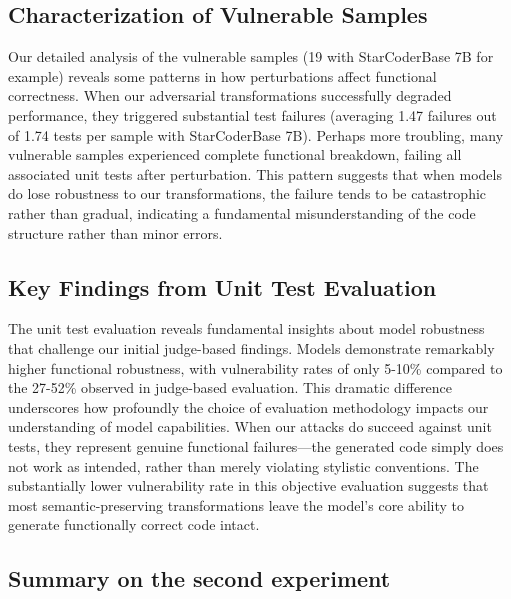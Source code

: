 \documentclass[%
thesis=student,%
coverpage=false,%
titlepage=false,%
headmarks=true, %
english,%
font=libertine, %
math=newpxtx, %
BCOR=5mm,%
coverBCOR=11mm%
]{tum-templates/book/tumbook}
\begin{document}
\subsection{Characterization of Vulnerable Samples}

Our detailed analysis of the vulnerable samples (19 with StarCoderBase 7B for example) reveals some patterns in how perturbations affect functional correctness. When our adversarial transformations successfully degraded performance, they triggered substantial test failures (averaging 1.47 failures out of 1.74 tests per sample with StarCoderBase 7B). Perhaps more troubling, many vulnerable samples experienced complete functional breakdown, failing all associated unit tests after perturbation. This pattern suggests that when models do lose robustness to our transformations, the failure tends to be catastrophic rather than gradual, indicating a fundamental misunderstanding of the code structure rather than minor errors.


\subsection{Key Findings from Unit Test Evaluation}

The unit test evaluation reveals fundamental insights about model robustness that challenge our initial judge-based findings. Models demonstrate remarkably higher functional robustness, with vulnerability rates of only 5-10\% compared to the 27-52\% observed in judge-based evaluation. This dramatic difference underscores how profoundly the choice of evaluation methodology impacts our understanding of model capabilities. When our attacks do succeed against unit tests, they represent genuine functional failures—the generated code simply does not work as intended, rather than merely violating stylistic conventions. The substantially lower vulnerability rate in this objective evaluation suggests that most semantic-preserving transformations leave the model's core ability to generate functionally correct code intact.


\subsection{Summary on the second experiment}
\end{document}
